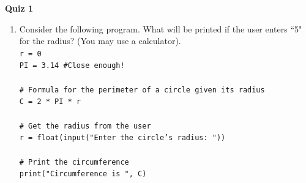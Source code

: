 \documentclass{article}
\begin{document}
\fancyfoot[C]{\thepage}
\vspace*{0cm}
\begin{center}
	{\LARGE \textbf{Quiz 1}}\\
	\vspace{.25cm}
\end{center}

\begin{enumerate}
	\item Consider the following program. What will be printed if the user enters ``5" for the radius? (You may use a calculator).\\
\texttt{r = 0}\\
\texttt{PI = 3.14 \#Close enough!}\\
\texttt{}\\
\texttt{\# Formula for the perimeter of a circle given its radius}\\
\texttt{C = 2 * PI * r}\\
\texttt{}\\
\texttt{\# Get the radius from the user}\\
\texttt{r = float(input("Enter the circle's radius: "))}\\
\texttt{}\\
\texttt{\# Print the circumference}\\
\texttt{print("Circumference is ", C)}\\


\end{enumerate}
\end{document}
